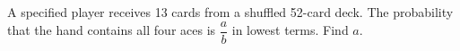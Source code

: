 A specified player receives 13 cards from a shuffled 52-card deck. The probability that the hand contains all four aces is $\dfrac{a}{b}$ in lowest terms. Find $ a $.
